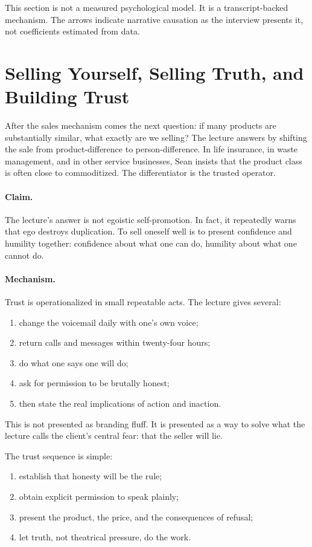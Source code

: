 \begin{remark}
This section is not a measured psychological model. It is a transcript-backed mechanism. The arrows indicate narrative causation as the interview presents it, not coefficients estimated from data.
\end{remark}

\section{Selling Yourself, Selling Truth, and Building Trust}

After the sales mechanism comes the next question: if many products are substantially similar, what exactly are we selling? The lecture answers by shifting the sale from product-difference to person-difference. In life insurance, in waste management, and in other service businesses, Sean insists that the product class is often close to commoditized. The differentiator is the trusted operator.

\paragraph{Claim.}
The lecture's answer is not egoistic self-promotion. In fact, it repeatedly warns that ego destroys duplication. To sell oneself well is to present confidence and humility together: confidence about what one can do, humility about what one cannot do.

\paragraph{Mechanism.}
Trust is operationalized in small repeatable acts. The lecture gives several:
\begin{enumerate}
\item change the voicemail daily with one's own voice;
\item return calls and messages within twenty-four hours;
\item do what one says one will do;
\item ask for permission to be brutally honest;
\item then state the real implications of action and inaction.
\end{enumerate}

This is not presented as branding fluff. It is presented as a way to solve what the lecture calls the client's central fear: that the seller will lie.

The trust sequence is simple:
\begin{enumerate}
\item establish that honesty will be the rule;
\item obtain explicit permission to speak plainly;
\item present the product, the price, and the consequences of refusal;
\item let truth, not theatrical pressure, do the work.
\end{enumerate}

